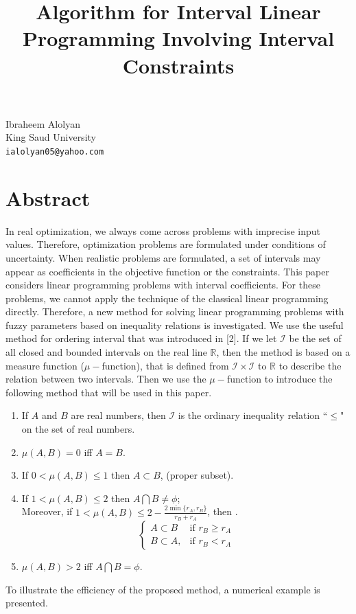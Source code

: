 \documentclass[article, A4, 11pt]{llncs}%
\begin{document}
\title{Algorithm for Interval Linear  Programming Involving Interval Constraints}
 \author{} \institute{}
\maketitle
\begin{center}
{\large Ibraheem Alolyan}\\
King Saud University\\
{\tt ialolyan05@yahoo.com}
\end{center}

\section*{Abstract}
In real optimization, we always come across problems with imprecise input values. Therefore, optimization problems are formulated under conditions of uncertainty. When realistic problems are formulated, a set of intervals may appear as coefficients in the objective function or the constraints. This paper considers linear programming problems with interval coefficients. For these problems, we cannot apply the technique of the classical linear programming directly. Therefore, a new method for solving linear programming problems with fuzzy parameters based on inequality relations  is investigated. We use the useful method for ordering interval that was introduced in [2]. If we let   $\mathscr{I}$ be the set of all closed and bounded intervals on the real line $\mathbb R$, then the method is based on a measure function ($\mu-$function), that is defined from $\mathscr{I} \times \mathscr{I}$ to $\mathbb R$ to describe the relation between two intervals. 
Then we use the $\mu-$function to introduce the following method that will be used in this paper.
            \begin{proposition}
            \begin{enumerate}
            \item If $A$ and $B$ are real numbers, then $\mathscr{I}$ is the  ordinary inequality
            relation ``$\leq$" on the set of real numbers.
            \item $\mu (A,B) = 0 $ iff $A=B$.
            \item If $0 < \mu (A,B) \leq 1 $ then $ A \subset B$, (proper subset).
            \item If $1 < \mu (A,B) \leq 2 $ then $ A \bigcap B\neq \phi$; \\ Moreover,
            if  $1 < \mu (A,B) \leq 2 - \frac{2 \min\{r_A,r_B\}}{r_B+r_A}$, then  .
                  $$\begin{cases}
                   A \subset B   &\textrm{if  $r_B  \geq r_A$}\\
                   B \subset A,&\textrm{if $r_B  < r_A$}
                   \end{cases}$$
            \item $  \mu (A,B) > 2$ iff $ A \bigcap B = \phi$.
            \end{enumerate}
            \end{proposition}
To illustrate the efficiency of the proposed method, a numerical 
example is presented.
\end{document}
